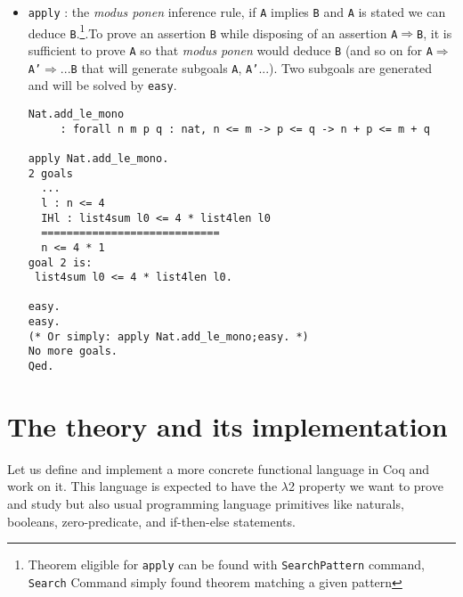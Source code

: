 \documentclass{article}
\begin{document}
\begin{itemize}
\begin{verbatim}
rewrite Nat.mul_add_distr_l.
  ...
  ============================
  n + list4sum l0 <= 4 * 1 + 4 * list4len l0\end{verbatim}
            \item \texttt{apply} : the \textit{modus ponen} inference rule, if \texttt{A} implies \texttt{B} and \texttt{A} is stated we can deduce \texttt{B}.\footnote{Theorem eligible for \texttt{apply} can be found with \texttt{SearchPattern} command, \texttt{Search} Command simply found theorem matching a given pattern}.To prove an assertion \texttt{B} while disposing of an assertion \texttt{A}$\Rightarrow$\texttt{B}, it is sufficient to prove \texttt{A} so that \textit{modus ponen} would deduce \texttt{B} (and so on for \texttt{A}$\Rightarrow$\texttt{A'}$\Rightarrow$...\texttt{B} that will generate subgoals \texttt{A}, \texttt{A'}...). Two subgoals are generated and will be solved by \texttt{easy}.
            \begin{verbatim}Nat.add_le_mono
     : forall n m p q : nat, n <= m -> p <= q -> n + p <= m + q
     
apply Nat.add_le_mono.
2 goals
  ...
  l : n <= 4
  IHl : list4sum l0 <= 4 * list4len l0
  ============================
  n <= 4 * 1
goal 2 is:
 list4sum l0 <= 4 * list4len l0.

easy.
easy.
(* Or simply: apply Nat.add_le_mono;easy. *)
No more goals.
Qed. \end{verbatim}
        \end{itemize}
        
\section{The theory and its implementation}
    Let us define and implement a more concrete functional language in Coq and work on it. This language is expected to have the $\lambda$2 property we want to prove and study but also usual programming language primitives like naturals, booleans, zero-predicate, and if-then-else statements.
    
\end{document}
